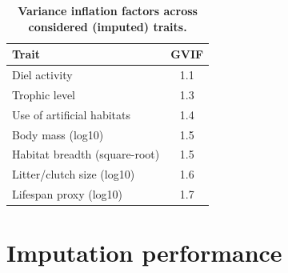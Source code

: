 \begin{table}[h!]
\renewcommand{\baselinestretch}{1}
\renewcommand{\arraystretch}{1.2}
\begin{center}\fontsize{9}{11}\selectfont
\caption[Variance inflation factors across considered (imputed) traits]{\textbf{Variance inflation factors across considered (imputed) traits.}} 
\label{}  
\begin{tabular}{|l|c|}
\hline
\textbf{Trait}                & \multicolumn{1}{l|}{\textbf{GVIF}} \\ \hline
Diel activity                 & 1.1                                \\ 
Trophic level                 & 1.3                                \\ 
Use of artificial habitats    & 1.4                                \\
Body mass (log10)             & 1.5                                \\ 
Habitat breadth (square-root) & 1.5                                \\ 
Litter/clutch size (log10)    & 1.6                                \\ 
Lifespan proxy (log10)        & 1.7                                \\ \hline
\end{tabular}
\end{center}
\end{table}

\newpage

\section{Imputation performance}

